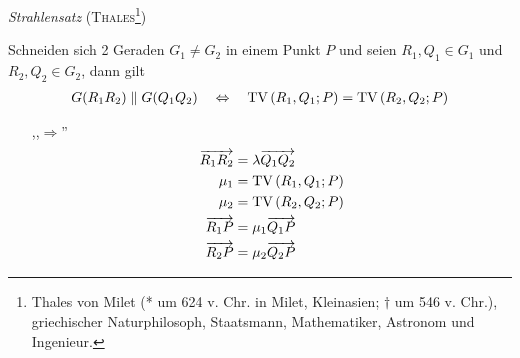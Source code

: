 \begin{mysatz}\textit{Strahlensatz} (\textsc{Thales}\footnote{Thales von Milet (* um 624 v. Chr. in Milet, Kleinasien; $\dagger$ um 546 v. Chr.), griechischer Naturphilosoph, Staatsmann, Mathematiker, Astronom und Ingenieur.})

    Schneiden sich 2 Geraden $G_1 \neq G_2$ in einem Punkt $P$ und seien $R_1, Q_1 \in G_1$ und $R_2, Q_2 \in G_2$, dann gilt
    \begin{align*}
        G(R_1 R_2) \parallel G(Q_1 Q_2) \quad \Leftrightarrow \quad \text{TV}\left( R_1, Q_1; P \right) = \text{TV}\left( R_2, Q_2; P \right)
    \end{align*}
    \begin{minipage}{0.6\textwidth}
        \begin{itemize}
            \item[,,$\Rightarrow$'']
                \begin{align*}
                    \overrightarrow{R_1 R_2} & = \lambda \overrightarrow{Q_1 Q_2}\\
                    \mu_1 & = \text{TV}\left( R_1, Q_1; P \right)\\
                    \mu_2 & = \text{TV}\left( R_2, Q_2; P \right)\\
                    \overrightarrow{R_1 P} & = \mu_1 \overrightarrow{Q_1 P}\\
                    \overrightarrow{R_2 P} & = \mu_2 \overrightarrow{Q_2 P}
                \end{align*}
        \end{itemize}
    \end{minipage}
    \begin{minipage}{0.4\textwidth}
        \begin{center}

\end{center}
\end{minipage}
\end{mysatz}
